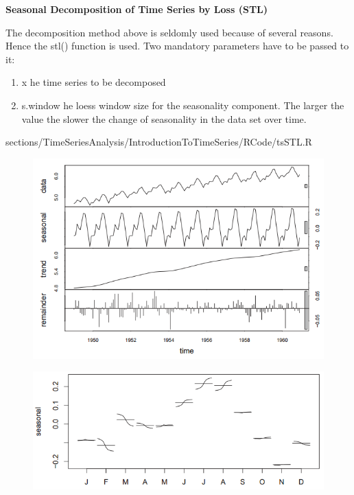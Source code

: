 		\RTheory
		{
			\textbf{Seasonal Decomposition of Time Series by Loss (STL)}
			
			\vfill
			
			The decomposition method above is seldomly used because of several reasons. Hence the {\color{blue}stl()} function is used. Two mandatory parameters have to be passed to it:
			
			\begin{enumerate}
				\item {\color{blue}x} he time series to be decomposed
				\item {\color{blue}s.window} he loess window size for the seasonality component. The larger the value the slower the change of seasonality in the data set over time.
			\end{enumerate}
		}
		{
			sections/TimeSeriesAnalysis/IntroductionToTimeSeries/RCode/tsSTL.R
		}
		
		\begin{figure}[H]\centering
			\begin{minipage}[c]{0.5\textwidth}
				\includegraphics[width=1\linewidth]{images/tsSTL.png}
				\label{Fig:tsSTL}
			\end{minipage}\hfill
			\begin{minipage}[c]{0.5\textwidth}
				\includegraphics[width=1\linewidth]{images/tsMonthplot.png}
				\label{Fig:tsMonthplot}
			\end{minipage}
		\end{figure}